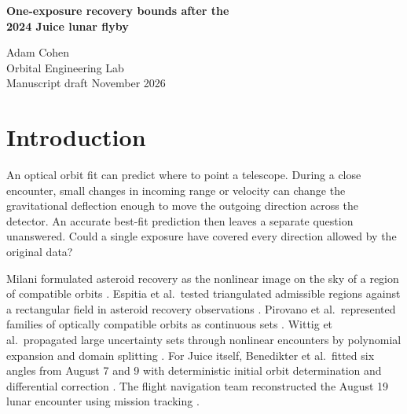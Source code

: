 \documentclass[10pt,letterpaper]{article}
\newcommand{\degc}{^{\circ}}
\newcommand{\as}{^{\prime\prime}}
\begin{document}
\begin{center}
{\LARGE\bfseries One-exposure recovery bounds after the\\[3pt] 2024 Juice lunar flyby\par}
\vspace{9pt}
{\large Adam Cohen}\\[2pt]
Orbital Engineering Lab\\[4pt]
{\small Manuscript draft  November 2026}
\end{center}

\begin{abstract}\normalsize
A least-squares orbit fitted to 25 optical observations of ESA's Juice spacecraft predicted its direction after the 2024 lunar flyby to within $0.0503\degc$ of the JPL reconstruction. Yet centering an ideal, freely rotatable $4.4\degc$ square on that prediction misses an admissible direction at every roll. At a hard $2.00\as$ residual cap per exposure, the direction lies at least $3.18018\degc$ from the prediction, beyond the $3.10974\degc$ corner radius. A $0.20557\degc$ pointing change covers the modeled family in a numerical enclosure of 638 incoming regions. The minimum square side is between $4.314\degc$ and $4.400\degc$. Under point-mass lunar gravity and a spherical surface, three compatible orbits exclude every pointing by $2.148\as$, although each pair fits. A terrain and lunar-gravity replay rejects one of those orbits. A nearby replacement clears the sampled terrain and recovers the three-direction obstruction numerically. These caps bracket a transition for the selected arc and nominal model. A single exposure from the preceding night rejects all four nominal orbits used to demonstrate the two failures.

\end{abstract}

\section{Introduction}
An optical orbit fit can predict where to point a telescope. During a close encounter, small changes in incoming range or velocity can change the gravitational deflection enough to move the outgoing direction across the detector. An accurate best-fit prediction then leaves a separate question unanswered. Could a single exposure have covered every direction allowed by the original data?

Milani formulated asteroid recovery as the nonlinear image on the sky of a region of compatible orbits \cite{milani}. Espitia et al.\ tested triangulated admissible regions against a rectangular field in asteroid recovery observations \cite{espitia}. Pirovano et al.\ represented families of optically compatible orbits as continuous sets \cite{piro}. Wittig et al.\ propagated large uncertainty sets through nonlinear encounters by polynomial expansion and domain splitting \cite{wittig}. For Juice itself, Benedikter et al.\ fitted six angles from August 7 and 9 with deterministic initial orbit determination and differential correction \cite{tracer}. The flight navigation team reconstructed the August 19 lunar encounter using mission tracking \cite{dietz}.
\end{document}
